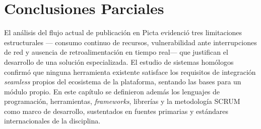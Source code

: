 \section{Conclusiones Parciales}

El análisis del flujo actual de publicación en Picta evidenció tres limitaciones estructurales ---
consumo continuo de recursos, vulnerabilidad ante interrupciones de red y ausencia de
retroalimentación en tiempo real--- que justifican el desarrollo de una solución especializada. El
estudio de sistemas homólogos confirmó que ninguna herramienta existente satisface los requisitos
de integración \textit{seamless} propios del ecosistema de la plataforma, sentando las bases para
un módulo propio. En este capítulo se definieron además los lenguajes de programación, herramientas,
\textit{frameworks}, librerías y la metodología SCRUM como marco de desarrollo, sustentados en
fuentes primarias y estándares internacionales de la disciplina.